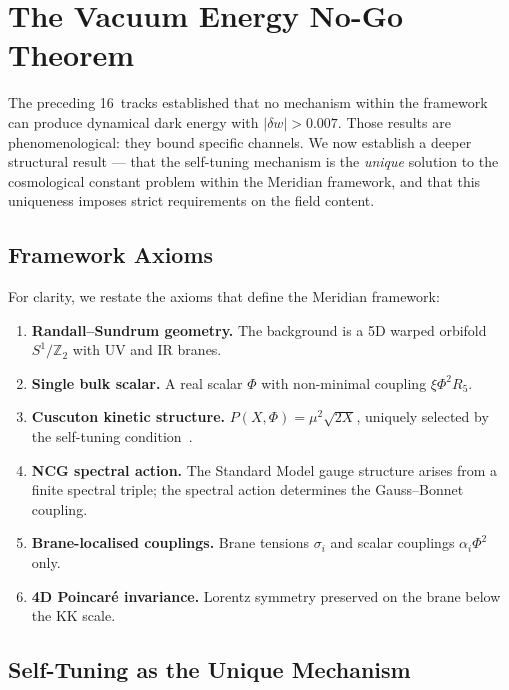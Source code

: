 \section{The Vacuum Energy No-Go Theorem}
\label{sec:3-vacuum-nogo}

The preceding 16~tracks established that no mechanism within the framework can produce dynamical dark energy with $|\delta w| > 0.007$. Those results are phenomenological: they bound specific channels. We now establish a deeper structural result --- that the self-tuning mechanism is the \emph{unique} solution to the cosmological constant problem within the Meridian framework, and that this uniqueness imposes strict requirements on the field content.

\subsection{Framework Axioms}
\label{sec:3-vnogo-axioms}

For clarity, we restate the axioms that define the Meridian framework:

\begin{enumerate}
  \item[\textbf{(A1)}] \textbf{Randall--Sundrum geometry.} The background is a 5D warped orbifold $S^1/\mathbb{Z}_2$ with UV and IR branes.
  \item[\textbf{(A2)}] \textbf{Single bulk scalar.} A real scalar $\Phi$ with non-minimal coupling $\xi\Phi^2 R_5$.
  \item[\textbf{(A3)}] \textbf{Cuscuton kinetic structure.} $P(X,\Phi) = \mu^2\sqrt{2X}$, uniquely selected by the self-tuning condition~\cite{ch3:afshordi2007,ch3:derham2016}.
  \item[\textbf{(A4)}] \textbf{NCG spectral action.} The Standard Model gauge structure arises from a finite spectral triple; the spectral action determines the Gauss--Bonnet coupling.
  \item[\textbf{(A5)}] \textbf{Brane-localised couplings.} Brane tensions $\sigma_i$ and scalar couplings $\alpha_i \Phi^2$ only.
  \item[\textbf{(A6)}] \textbf{4D Poincar\'e invariance.} Lorentz symmetry preserved on the brane below the KK scale.
\end{enumerate}

\subsection{Self-Tuning as the Unique Mechanism}
\label{sec:3-vnogo-uniqueness}

